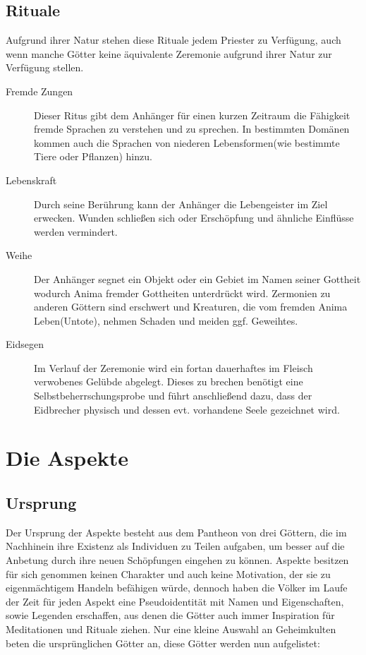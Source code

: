 \documentclass[a4paper,12pt,oneside]{book}
\begin{document}
\section{Rituale}
Aufgrund ihrer Natur stehen diese Rituale jedem Priester zu Verfügung, auch wenn manche Götter keine äquivalente Zeremonie aufgrund ihrer Natur zur Verfügung stellen.
\begin{description}
\item[Fremde Zungen]
Dieser Ritus gibt dem Anhänger für einen kurzen Zeitraum die Fähigkeit fremde Sprachen zu verstehen und zu sprechen. In bestimmten Domänen kommen auch die Sprachen von niederen Lebensformen(wie bestimmte Tiere oder Pflanzen) hinzu.
\item[Lebenskraft]
Durch seine Berührung kann der Anhänger die Lebengeister im Ziel erwecken. Wunden schließen sich oder Erschöpfung und ähnliche Einflüsse werden vermindert.
\item[Weihe]
Der Anhänger segnet ein Objekt oder ein Gebiet im Namen seiner Gottheit wodurch Anima fremder Gottheiten unterdrückt wird. Zermonien zu anderen Göttern sind erschwert und Kreaturen, die vom fremden Anima Leben(Untote), nehmen Schaden und meiden ggf. Geweihtes.
\item[Eidsegen]
Im Verlauf der Zeremonie wird ein fortan dauerhaftes im Fleisch verwobenes Gelübde abgelegt. Dieses zu brechen benötigt eine Selbstbeherrschungsprobe und führt anschließend dazu, dass der Eidbrecher physisch und dessen evt. vorhandene Seele gezeichnet wird.

\end{description}

\chapter{Die Aspekte}


\section{Ursprung}
Der Ursprung der Aspekte besteht aus dem Pantheon von drei Göttern, die im Nachhinein ihre Existenz als Individuen zu Teilen aufgaben, um besser auf die Anbetung durch ihre neuen Schöpfungen eingehen zu können. Aspekte besitzen für sich genommen keinen Charakter und auch keine Motivation, der sie zu eigenmächtigem Handeln befähigen würde, dennoch haben die Völker im Laufe der Zeit für jeden Aspekt eine Pseudoidentität mit Namen und Eigenschaften, sowie Legenden erschaffen, aus denen die Götter auch immer Inspiration für Meditationen und Rituale ziehen. Nur eine kleine Auswahl an Geheimkulten beten die ursprünglichen Götter an, diese Götter werden nun aufgelistet:
\end{document}
